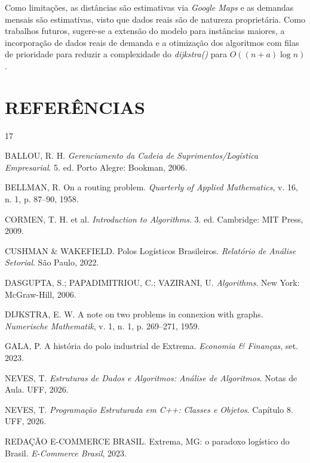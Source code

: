 \documentclass[12pt, a4paper]{article}
\begin{document}
Como limitações, as distâncias são estimativas via \textit{Google Maps} e as demandas mensais são estimativas, visto que dados reais são de natureza proprietária. Como trabalhos futuros, sugere-se a extensão do modelo para instâncias maiores, a incorporação de dados reais de demanda e a otimização dos algoritmos com filas de prioridade para reduzir a complexidade do \textit{dijkstra()} para $O((n+a)\log n)$.

\section*{REFERÊNCIAS}

\begin{thebibliography}{17}

BALLOU, R. H. \textit{Gerenciamento da Cadeia de Suprimentos/Logística Empresarial}. 5. ed. Porto Alegre: Bookman, 2006.

BELLMAN, R. On a routing problem. \textit{Quarterly of Applied Mathematics}, v. 16, n. 1, p. 87--90, 1958.

CORMEN, T. H. et al. \textit{Introduction to Algorithms}. 3. ed. Cambridge: MIT Press, 2009.

CUSHMAN \& WAKEFIELD. Polos Logísticos Brasileiros. \textit{Relatório de Análise Setorial}. São Paulo, 2022.

DASGUPTA, S.; PAPADIMITRIOU, C.; VAZIRANI, U. \textit{Algorithms}. New York: McGraw-Hill, 2006.

DIJKSTRA, E. W. A note on two problems in connexion with graphs. \textit{Numerische Mathematik}, v. 1, n. 1, p. 269--271, 1959.

GALA, P. A história do polo industrial de Extrema. \textit{Economia \& Finanças}, set. 2023.

NEVES, T. \textit{Estruturas de Dados e Algoritmos: Análise de Algoritmos}. Notas de Aula. UFF, 2026.

NEVES, T. \textit{Programação Estruturada em C++: Classes e Objetos}. Capítulo 8. UFF, 2026.

REDAÇÃO E-COMMERCE BRASIL. Extrema, MG: o paradoxo logístico do Brasil. \textit{E-Commerce Brasil}, 2023.


\end{thebibliography}
\end{document}
